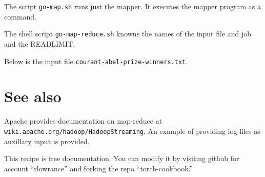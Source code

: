 \documentclass{article}
\let\code\texttt %
\begin{document}
The script \code{go-map.sh} runs just
the mapper. It executes the mapper program as a command.



The shell script \code{go-map-reduce.sh} knowns the names of the input
file and job and the READLIMIT.



Below is the input file \code{courant-abel-prize-winners.txt}.



\section{See also}

Apache provides documentation on map-reduce at
\code{wiki.apache.org/hadoop/HadoopStreaming}. An example of providing
log files as auxillary input is provided.

This recipe is free documentation. You can modify it by visiting
github for account ``rlowrance'' and forking the repo
``torch-cookbook.''
\end{document}
